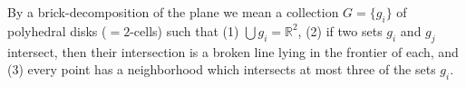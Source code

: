 By a brick-decomposition of the plane we mean a collection $G = \{g_i\}$ of polyhedral disks ($= 2$-cells) such that (1) $\bigcup g_i = \mathbb{R}^2$, (2) if two sets $g_i$ and $g_j$ intersect, then their intersection is a broken line lying in the frontier of each, and (3) every point has a neighborhood which intersects at most three of the sets $g_i$.
